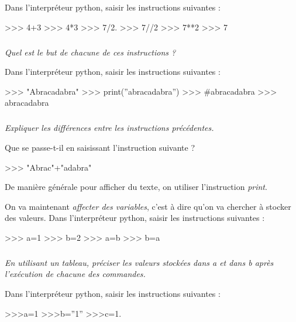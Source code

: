\documentclass[10pt]{article}
\begin{document}
Dans l'interpréteur python, saisir les instructions suivantes :
\begin{py}
\begin{python}
>>> 4+3
>>> 4*3
>>> 7/2.
>>> 7//2
>>> 7**2
>>> 7%
\end{python}
\end{py}

\subparagraph{}
\textit{Quel est le but de chacune de ces instructions ?}

Dans l'interpréteur python, saisir les instructions suivantes :
\begin{py}
\begin{python}
>>> "Abracadabra"
>>> print(''abracadabra'')
>>>  #abracadabra
>>>  abracadabra
\end{python}
\end{py}

\subparagraph{}
\textit{Expliquer les différences entre les instructions précédentes.}


\begin{rem}
Que se passe-t-il en saisissant l'instruction suivante ?
\begin{py}
\begin{python}
>>> "Abrac"+"adabra"
\end{python}
\end{py}
\end{rem}

\begin{rem}
De manière générale pour afficher du texte, on utiliser l'instruction \textsl{print}.
\end{rem}

On va maintenant \textit{affecter des variables}, c'est à dire qu'on va chercher à stocker des valeurs. Dans l'interpréteur python, saisir les instructions suivantes :

\begin{py}
\begin{python}
>>> a=1
>>> b=2
>>> a=b
>>> b=a
\end{python}
\end{py}

\subparagraph{} 
\textit{En utilisant un tableau, préciser les valeurs stockées dans a et dans b après l’exécution de chacune des commandes.}


Dans l'interpréteur python, saisir les instructions suivantes :
\begin{py}
\begin{python}
>>>a=1
>>>b=''1''
>>>c=1.
\end{python}
\end{py}
\end{document}
